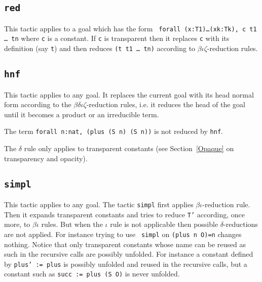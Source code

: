 %  


\subsection{{\tt red}
}

This tactic applies to a goal which has the form {\tt
  forall (x:T1)\dots(xk:Tk), c t1 \dots\ tn} where {\tt c} is a constant.  If
{\tt c} is transparent then it replaces {\tt c} with its definition
(say {\tt t}) and then reduces {\tt (t t1 \dots\ tn)} according to
$\beta\iota\zeta$-reduction rules.

\begin{ErrMsgs}
\item {}
\end{ErrMsgs}

\subsection{{\tt hnf}
}

This tactic applies to any goal. It replaces the current goal with its
head normal form according to the $\beta\delta\iota\zeta$-reduction
rules, i.e.  it reduces the head of the goal until it becomes a
product or an irreducible term.

\Example
The term \verb+forall n:nat, (plus (S n) (S n))+ is not reduced by {\tt hnf}.

\Rem The $\delta$ rule only applies to transparent constants
(see Section~\ref{Opaque} on transparency and opacity).

\subsection{\tt simpl
}

This tactic applies to any goal. The tactic {\tt simpl} first applies
$\beta\iota$-reduction rule.  Then it expands transparent constants
and tries to reduce {\tt T'} according, once more, to $\beta\iota$
rules. But when the $\iota$ rule is not applicable then possible
$\delta$-reductions are not applied.  For instance trying to use {\tt
simpl} on {\tt (plus n O)=n} changes nothing.  Notice that only
transparent constants whose name can be reused as such in the
recursive calls are possibly unfolded. For instance a constant defined
by {\tt plus' := plus} is possibly unfolded and reused in the
recursive calls, but a constant such as {\tt succ := plus (S O)} is
never unfolded.

